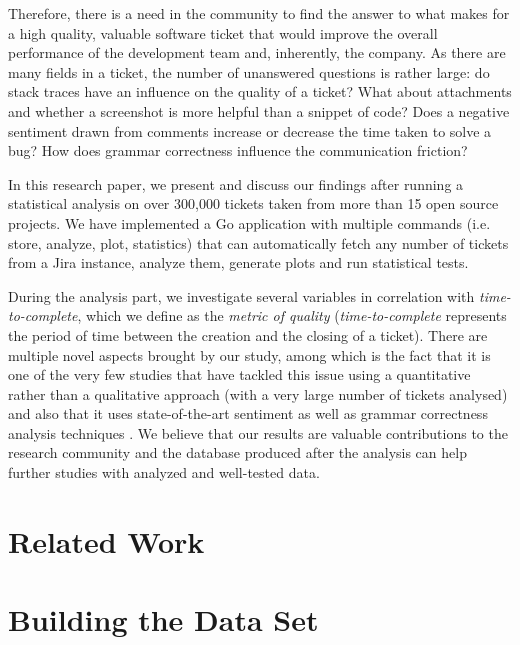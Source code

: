 \documentclass{mpaper}
\begin{document}
Therefore, there is a need in the community to find the answer to what makes for a high quality, valuable software ticket 
that would improve the overall performance of the development team and, inherently, the company. As there are many 
fields in a ticket, the number of unanswered questions is rather large: do stack traces have an influence on the quality
of a ticket? What about attachments and whether a screenshot is more helpful than a snippet of code? Does a negative sentiment
drawn from comments increase or decrease the time taken to solve a bug? How does grammar correctness influence the 
communication friction?

In this research paper, we present and discuss our findings after running a statistical analysis 
on over 300,000 tickets taken from more than 15 open source projects. We have implemented a Go application 
with multiple commands (i.e. store, analyze, plot, statistics) that can automatically fetch any number of tickets 
from a Jira instance, analyze them, generate plots and run statistical tests. 

During the analysis part, we investigate several variables in correlation with \emph{time-to-complete}, 
which we define as the \emph{metric of quality} (\emph{time-to-complete} represents the period of time between the creation 
and the closing of a ticket). There are multiple novel aspects brought by our study, among which is the fact that it is one of 
the very few studies that have tackled this issue using a quantitative rather than a qualitative approach (with a very 
large number of tickets analysed) and also that it uses state-of-the-art sentiment \cite{wilson2005recognizing} as well as 
grammar correctness analysis techniques \cite{wilson2005recognizing}. We believe that our results are valuable 
contributions to the research community and the database produced after the analysis can help further studies with 
analyzed and well-tested data.

\section{Related Work}

\section{Building the Data Set}
\end{document}
